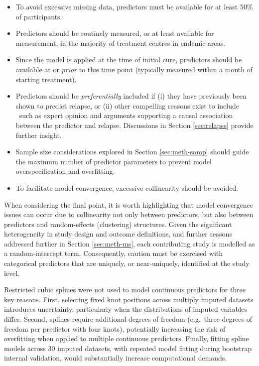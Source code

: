 \begin{itemize}[noitemsep]
  \item To avoid excessive missing data, predictors must be available for at least 50\% of participants.
  \item Predictors should be routinely measured, or at least available for measurement, in the majority of treatment centres in endemic areas.
  \item Since the model is applied at the time of initial cure, predictors should be available at or \textit{prior} to this time point (typically measured within a month of starting treatment).
  \item Predictors should be \textit{preferentially} included if (i) they have previously been shown to predict relapse, or (ii) other compelling reasons exist to include \textemdash\ such as expert opinion and arguments supporting a causal association between the predictor and relapse. Discussions in Section \ref{sec:relapse} provide further insight.
  \item Sample size considerations explored in Section \ref{sec:meth-samp} should guide the maximum number of predictor parameters to prevent model overspecification and overfitting.
  \item To facilitate model convergence, excessive collinearity should be avoided.
\end{itemize}

When considering the final point, it is worth highlighting that model convergence issues can occur due to collinearity not only between predictors, but also between predictors and random-effects (clustering) structures. Given the significant heterogeneity in study design and outcome definitions, and further reasons addressed further in Section \ref{sec:meth-ms}, each contributing study is modelled as a random-intercept term. Consequently, caution must be exercised with categorical predictors that are uniquely, or near-uniquely, identified at the study level.

\begin{mccorrection}
  Restricted cubic splines were not used to model continuous predictors for three key reasons. First, selecting fixed knot positions across multiply imputed datasets introduces uncertainty, particularly when the distributions of imputed variables differ. Second, splines require additional degrees of freedom (e.g.\ three degrees of freedom per predictor with four knots), potentially increasing the risk of overfitting when applied to multiple continuous predictors. Finally, fitting spline models across 30 imputed datasets, with repeated model fitting during bootstrap internal validation, would substantially increase computational demands.
\end{mccorrection}

